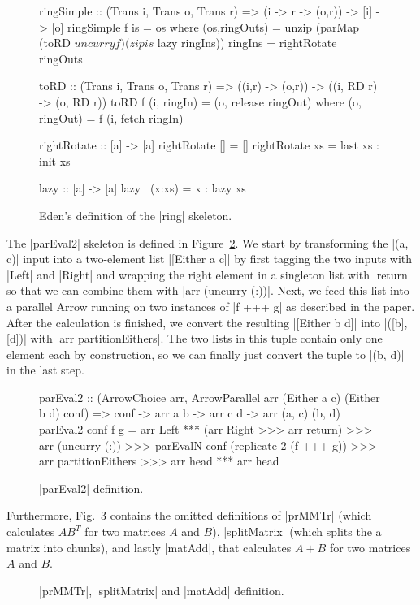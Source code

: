 \begin{figure}[h]
\begin{code}
ringSimple :: (Trans i, Trans o, Trans r) => (i -> r -> (o,r)) -> [i] -> [o]
ringSimple f is =  os
  where (os,ringOuts) = unzip (parMap (toRD $ uncurry f) (zip is $ lazy ringIns))
        ringIns = rightRotate ringOuts

toRD :: (Trans i, Trans o, Trans r) => ((i,r) -> (o,r)) -> ((i, RD r) -> (o, RD r))
toRD  f (i, ringIn)  = (o, release ringOut)
  where (o, ringOut) = f (i, fetch ringIn)

rightRotate    :: [a] -> [a]
rightRotate [] =  []
rightRotate xs =  last xs : init xs

lazy :: [a] -> [a]
lazy ~(x:xs) = x : lazy xs
\end{code}
\caption{Eden's definition of the |ring| skeleton.}
\label{fig:ringEden}
\end{figure}

The |parEval2| skeleton is defined in Figure~\ref{fig:parEval2}. 
We start by transforming the |(a, c)| input into a two-element list |[Either a c]| by first tagging the two inputs with |Left| and |Right| and wrapping the right element in a singleton list with |return| so that we can combine them with |arr (uncurry (:))|. Next, we feed this list into a parallel Arrow running on two instances of |f +++ g| as described in the paper. After the calculation is finished, we convert the resulting |[Either b d]| into |([b], [d])| with |arr partitionEithers|. The two lists in this tuple contain only one element each by construction, so we can finally just convert the tuple to |(b, d)| in the last step.
\begin{figure}[h]
\begin{code}
parEval2 :: (ArrowChoice arr,
	ArrowParallel arr (Either a c) (Either b d) conf) =>
	conf -> arr a b -> arr c d -> arr (a, c) (b, d)
parEval2 conf f g =
	arr Left *** (arr Right >>> arr return) >>>
	arr (uncurry (:)) >>>
	parEvalN conf (replicate 2 (f +++ g)) >>>
	arr partitionEithers >>>
	arr head *** arr head
\end{code}
	\caption{|parEval2| definition.}
	\label{fig:parEval2}
\end{figure}
Furthermore, Fig.~\ref{fig:torus_example_rest} contains the omitted definitions of |prMMTr| (which calculates $AB^T$ for two matrices $A$ and $B$), |splitMatrix| (which splits the a matrix into chunks), and lastly |matAdd|, that calculates $A + B$ for two matrices $A$ and $B$.
\begin{figure}[h]
	\caption{|prMMTr|, |splitMatrix| and |matAdd| definition.}
	\label{fig:torus_example_rest}
\end{figure} %

